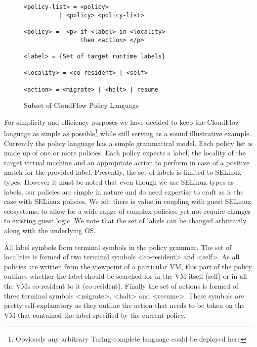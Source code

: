 \begin{figure}[t]
\vspace{-5pt}
\begin{Verbatim}[frame=single]
<policy-list> = <policy>
	      | <policy> <policy-list>

<policy> =  <p> if <label> in <locality> 
                then <action> </p>

<label> = {Set of target runtime labels}

<locality> = <co-resident> | <self>

<action> = <migrate> | <halt> | resume
\end{Verbatim}
\vspace{0pt}
\caption{Subset of CloudFlow Policy Language}
\label{figure:policystructure}
\end{figure}
For simplicity and efficiency purposes we have decided to keep the CloudFlow language as simple as possible\footnote{Obviously any arbitrary Turing-complete language could be deployed here} while still serving as a sound illustrative example. Currently the policy language has a simple grammatical model. Each policy list is made up of one or more policies. Each policy expects a label, the
locality of the target virtual machine and an appropriate action to perform
in case of a positive match for the provided label. Presently, the set of labels is limited to
SELinux \cite{SeStat} types. However it must be noted that even though we use SELinux types as labels, our policies are simple in nature and do need expertise to craft as is the case with SELinux policies. We felt there is value in
coupling with guest SELinux ecosystems, to allow for a wide range of complex
policies, yet not require changes to existing guest logic. We note that the set of labels can be changed arbitrarily along with the underlying OS.

All label symbols form terminal symbols in the policy grammar. The set of localities is formed of two terminal symbols {\textless co-resident\textgreater} and {\textless self\textgreater}. As all policies are written from the viewpoint of a particular VM, this part of the policy outlines whether the label should be searched for in the VM itself (self) or in all the VMs co-resident to it (co-resident). Finally the set of actions is formed of three terminal symbols  {\textless migrate\textgreater}, {\textless halt\textgreater} and {\textless resume\textgreater}. These symbols are pretty self-explanatory as they outline the action that needs to be taken on the VM that contained the label specified by the current policy.

